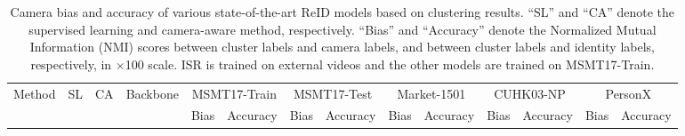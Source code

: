\begin{table}[t]
    \tiny
    \caption{
        Camera bias and accuracy of various state-of-the-art ReID models based on clustering results. 
        ``SL'' and ``CA'' denote the supervised learning and camera-aware method, respectively.
        ``Bias'' and ``Accuracy'' denote the Normalized Mutual Information (NMI) scores between cluster labels and camera labels, and between cluster labels and identity labels, respectively, in $\times$100 scale.
        ISR is trained on external videos and the other models are trained on MSMT17-Train.
    }
    \vspace{3pt}
    \label{tab:motivation}
    \setlength{\tabcolsep}{0.61em}  %
    \centering
    {
    \renewcommand{\arraystretch}{1.2}
    \begin{tabular}{lccc|cc|cc|cc|cc|cc}
        \hline
        \multicolumn{1}{l}{\multirow{2}{*}{Method}} & 
        \multicolumn{1}{c}{\multirow{2}{*}{SL}} & 
        \multicolumn{1}{c}{\multirow{2}{*}{CA}} & 
        \multicolumn{1}{c|}{\multirow{2}{*}{Backbone}} & 
        \multicolumn{2}{c|}{MSMT17-Train} & 
        \multicolumn{2}{c|}{MSMT17-Test} & 
        \multicolumn{2}{c|}{Market-1501} &
        \multicolumn{2}{c|}{CUHK03-NP} &
        \multicolumn{2}{c}{PersonX} \\
        
        \cline{5-14}
        \multicolumn{1}{c}{} &
        \multicolumn{1}{c}{} &
        \multicolumn{1}{c}{} &  
        \multicolumn{1}{c|}{} & 
        Bias & Accuracy & Bias & Accuracy & Bias & Accuracy & Bias & Accuracy  & Bias & Accuracy \\ 
        \hline \hline
        

\end{tabular}}
\end{table}

